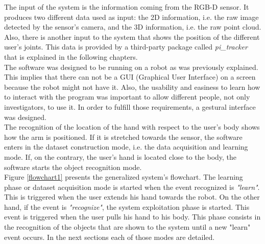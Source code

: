 The input of the system is the information coming from the RGB-D sensor. 
It produces two different data used as input: the 2D information, i.e. the raw image detected by the sensor's camera, and the 3D information, i.e. the raw point cloud. 
Also, there is another input to the system that shows the position of the different user's joints. This data is provided by a third-party package called \textit{pi\_tracker} that is explained in the following chapters. 
\\

The software was designed to be running on a robot as was previously explained. 
This implies that there can not be a GUI (Graphical User Interface) on a screen because the robot might not have it. 
Also, the usability and easiness to learn how to interact with the program was important to allow different people, not only investigators, to use it. 
In order to fulfill those requirements, a gestural interface was designed. 
\\

The recognition of the location of the hand with respect to the user's body shows how the arm is positioned. 
If it is stretched towards the sensor, the software enters in the dataset construction mode, i.e. the data acquisition and learning mode. 
If, on the contrary, the user's hand is located close to the body, the software starts the object recognition mode. 
\\

Figure \ref{flowchart1} presents the generalized system's flowchart. 
The learning phase or dataset acquisition mode is started when the event recognized is \textit{"learn"}.
This is triggered when the user extends his hand towards the robot. 
On the other hand, if the event is \textit{"recognize"}, the system exploitation phase is started. 
This event is triggered when the user pulls his hand to his body.
This phase consists in the recognition of the objects that are shown to the system until a new "learn" event occurs. 
In the next sections each of those modes are detailed. 


